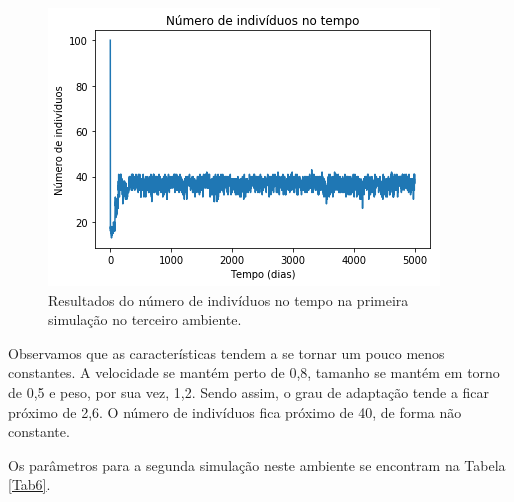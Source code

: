 \documentclass[10pt,brazil,english]{article}
\begin{document}
            \begin{figure}[!hbtp]
                \begin{center}
                    \includegraphics[scale=0.5]{Images/3-3.png}
                \end{center}
                \caption{Resultados do número de indivíduos no tempo na primeira simulação no terceiro ambiente.}
                \label{Fig15}
            \end{figure}
            
            Observamos que as características tendem a se tornar um pouco menos constantes. A velocidade se mantém perto de 0,8, tamanho se mantém em torno de 0,5 e peso, por sua vez, 1,2. Sendo assim, o grau de adaptação tende a ficar próximo de 2,6. O número de indivíduos fica próximo de 40, de forma não constante.
            
            Os parâmetros para a segunda simulação neste ambiente se encontram na Tabela \ref{Tab6}.
            
\end{document}

